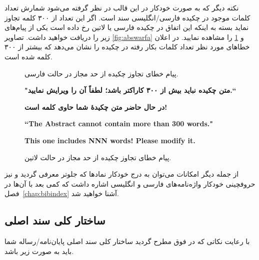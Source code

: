      نکته دیگر که به صورت خودکار در این قالب در نظر گرفته می‌شود شمارش تعداد کلمات موجود در چکیده فارسی/انگلیسی سند است. 
     اگر این تعداد از ۳۰۰ کلمه تجاوز نماید بسته به اینکه این اتفاق در چکیده فارسی یا لاتین رخ داده است یکی از پیام‌های زیر را دریافت 
     خواهید داشت. تصاویر \ref{fig:abswarfa}  و \ref{fig:abswaren} را مشاهده نمایید. در اعلان خطاهای مورد نظر  
     تعداد کلمات بکار رفته در چکیده را نشان می‌دهد که بیشتر از ۳۰۰ کلمه شده است. 
     
     \begin{figure}[!hbtp]
        \caption{پیام خطای تجاوز چکیده از حد مجاز در حالت فارسی.}   
        \label{fig:abswarfa}   
        \centerline{\color{red}\bfseries\zarfont "متن چکیده نباید بیش از ۳۰۰ کاراکتر باشد؛‌ لطفاً آن را ویرایش نمایید.``}
        \centerline{\color{gray}\bfseries\zarfont در حال حاضر متن چکیدهٔ شما حاوی  کلمه است!}
        
             
       \caption{پیام خطای تجاوز چکیده از حد مجاز در حالت لاتین.}        
        \label{fig:abswaren} 
        \medskip
    \begin{latin}
        \centerline{\color{red}\bfseries ``The Abstract cannot contain more than 300 words."}
        \centerline{\color{gray}\bfseries This one includes NNN words! Please modify it.}%
    \end{latin}    
     \end{figure}
     
    از جمله دیگر امکانات می‌توان به درج خودکار نمادها که جلوتر معرفی گردید و نیز حروفچینی خودکار واژه‌نامه‌های فارسی و انگلیسی اشاره داشت 
    که کمی بعد با آن‌ها در فصل~\ref{chap:bibindex} آشنا خواهید شد. 
    \subsection{ساختار کلی سند اصلی}
    با رعایت نکاتی که در فوق مطرح گردید ساختار کلی سند اصلی پایان‌نامه/رساله‌ شما باید به صورت زیر باشد.

